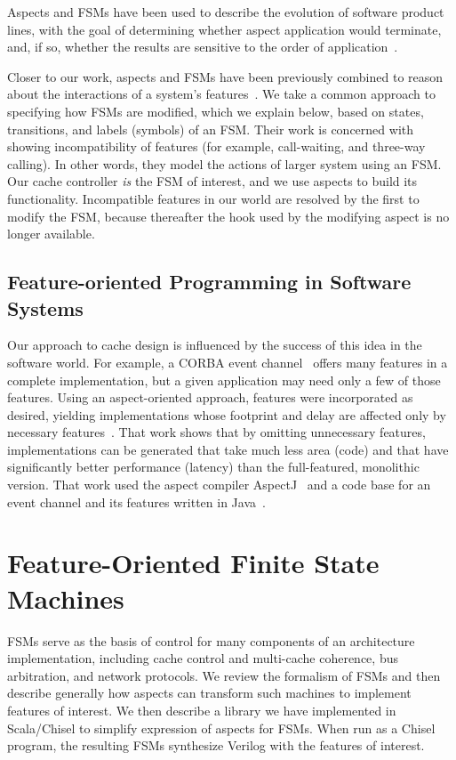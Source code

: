 \documentclass[conference]{IEEEtran}
\begin{document}
Aspects and FSMs have been used to describe the evolution of software product lines, with the goal of determining whether aspect application would terminate, and, if so, whether the results are sensitive to the order of application~\cite{aspectsUML}.

Closer to our work, aspects and FSMs have been previously combined to reason about the interactions of a system's features~\cite{6078174}.  We take a common approach to specifying how FSMs are modified, which we explain below, based on states, transitions, and labels (symbols) of an FSM.  Their work is concerned with showing incompatibility of features (for example, call-waiting, and three-way calling).  In other words, they model the actions of larger system using an FSM.  Our cache controller \emph{is} the FSM of interest, and we use aspects to build its functionality.   Incompatible features in our world are resolved by the first to modify the FSM, because thereafter the hook used by the modifying aspect is no longer available.

\subsection{Feature-oriented Programming in Software Systems}
Our approach to cache design is influenced by the success of this idea in the software world.  For example, a CORBA event channel~\cite{Defago:97} offers many features in a complete implementation, but a given application may need only a few of those features.  Using an aspect-oriented approach, features were incorporated as desired, yielding implementations whose footprint and delay are affected only by necessary features~\cite{Hunleth:02}.  That work shows that by omitting unnecessary features, implementations can be generated that take much less area (code) and that have significantly better performance (latency) than the full-featured, monolithic version.  That work used the aspect compiler AspectJ~\cite{AspectJ:01} and a code base for an event channel and its features written in Java~\cite{java:22}.


\section{Feature-Oriented Finite State Machines}\label{sec:fsm}

FSMs serve as the basis of control for many components of an architecture implementation, including cache control and multi-cache coherence, bus arbitration, and network protocols.  We review the formalism of FSMs and then describe generally how aspects can transform such machines to implement features of interest.  We then describe a library we have implemented in Scala/Chisel to simplify expression of aspects for FSMs.  When run as a Chisel program, the resulting FSMs synthesize Verilog with the features of interest.
\end{document}
